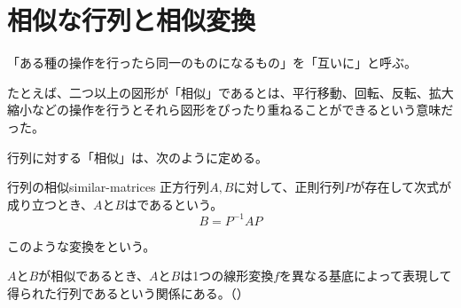 \documentclass[../../../topic_linear-algebra]{subfiles}
\begin{document}
\sectionline
\section{相似な行列と相似変換}

「ある種の操作を行ったら同一のものになるもの」を「互いに」と呼ぶ。

\br

たとえば、二つ以上の図形が「相似」であるとは、平行移動、回転、反転、拡大縮小などの操作を行うとそれら図形をぴったり重ねることができるという意味だった。

\br

行列に対する「相似」は、次のように定める。

\begin{definition}{行列の相似}{similar-matrices}
  正方行列$A,B$に対して、正則行列$P$が存在して次式が成り立つとき、$A$と$B$はであるという。
  \begin{equation*}
    B = P^{-1} A P
  \end{equation*}
\end{definition}

このような変換をという。

\br

$A$と$B$が相似であるとき、$A$と$B$は1つの線形変換$f$を異なる基底によって表現して得られた行列であるという関係にある。（）
\end{document}
